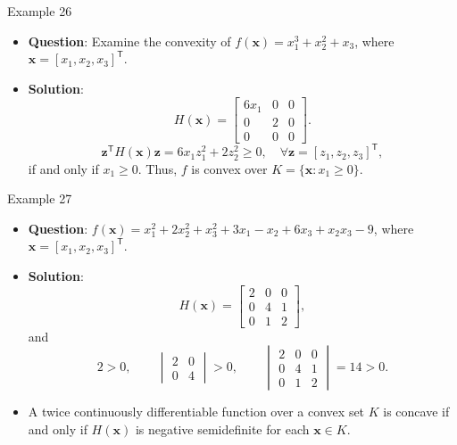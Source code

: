 \documentclass[aspectratio=169,hyperref,UTF8,CJK]{beamer}
\newcommand{\trans}{\mathsf{T}}
\newcommand{\vect}[1]{\boldsymbol{#1}}
\begin{document}
\begin{frame}{Example 26}
  \small
  \begin{itemize}
    \item \textbf{Question}: Examine the convexity of $f(\vect{x})=x_1^3+x_2^2+x_3$, where $\vect{x}=[x_1,x_2,x_3]^{\trans}$.
    \item \textbf{Solution}:
      \begin{equation*}
        H(\vect{x})=\begin{bmatrix}6x_1&0&0\\0&2&0\\0&0&0\end{bmatrix}.
      \end{equation*}
      \begin{equation*}
        \vect{z}^{\trans}H(\vect{x})\vect{z}=6x_1z_1^2+2z_2^2\ge0,
        \quad\forall\vect{z}=[z_1,z_2,z_3]^{\trans},
      \end{equation*}
      if and only if $x_1\ge0$. Thus, $f$ is convex over $K=\{\vect{x}:x_1\ge0\}$.
  \end{itemize}
\end{frame}

\begin{frame}{Example 27}
  \small
  \begin{itemize}
    \item \textbf{Question}: $f(\vect{x})=x_1^2+2x_2^2+x_3^2+3x_1-x_2+6x_3+x_2x_3-9$, where $\vect{x}=[x_1,x_2,x_3]^{\trans}$.
    \item \textbf{Solution}:
      \begin{equation*}
        H(\vect{x})=\begin{bmatrix}2&0&0\\0&4&1\\0&1&2\end{bmatrix},
      \end{equation*}
      and
      \begin{equation*}
        2>0,\qquad
        \begin{vmatrix}2&0\\0&4\end{vmatrix}>0,\qquad
        \begin{vmatrix}2&0&0\\0&4&1\\0&1&2\end{vmatrix}=14>0.
      \end{equation*}
    \item A twice continuously differentiable function over a convex set $K$ is concave if and only if $H(\vect{x})$ is negative semidefinite for each $\vect{x}\in K$.
  \end{itemize}
\end{frame}
\end{document}
